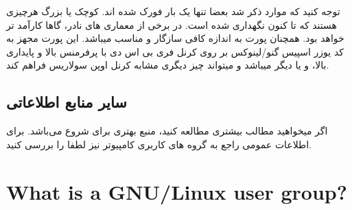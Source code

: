 \documentclass{HOWTO}
\begin{document}
توجه کنید که موارد ذکر شد بعضا تنها یک بار فورک شده اند. کوچک یا بزرگ هرچیزی هستند که تا کنون نگهداری شده است. در برخی از معماری های نادر،
گاها کارآمد تر خواهد بود. همچنان پورت
به اندازه کافی سازگار و مناسب میباشد. این پورت مجهز به کد یوزر اسپیس گنو/لینوکس بر روی کرنل فری بی اس دی با پرفرمنس بالا و پایداری بالا،
و یا دیگر 
میباشد و میتواند چیز دیگری مشابه کرنل اوپن سولاریس فراهم کند.



\subsection{سایر منابع اطلاعاتی}

اگر میخواهید مطالب بیشتری مطالعه کنید، 
منبع بهتری برای شروع می‌باشد. برای اطلاعات عمومی راجع به گروه های کاربری کامپیوتر نیز لطفا
را بررسی کنید.



\section{What is a GNU/Linux user group?}
\end{document}
